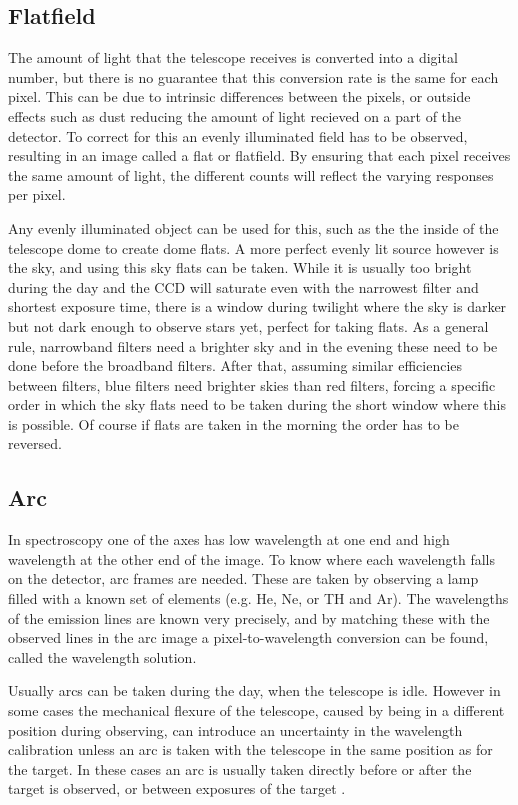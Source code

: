 \documentclass[a4paper,oneside,12pt, class=Latex/Classes/PhDthesisPSnPDF, crop=false]{standalone}
\begin{document}
\subsection{Flatfield}
The amount of light that the telescope receives is converted into a digital number, but there is no guarantee that this conversion rate is the same for each pixel. This can be due to intrinsic differences between the pixels, or outside effects such as dust reducing the amount of light recieved on a part of the detector. To correct for this an evenly illuminated field has to be observed, resulting in an image called a flat or flatfield. By ensuring that each pixel receives the same amount of light, the different counts will reflect the varying responses per pixel.

Any evenly illuminated object can be used for this, such as the the inside of the telescope dome to create dome flats. A more perfect evenly lit source however is the sky, and using this sky flats can be taken. While it is usually too bright during the day and the CCD will saturate even with the narrowest filter and shortest exposure time, there is a window during twilight where the sky is darker but not dark enough to observe stars yet, perfect for taking flats. As a general rule, narrowband filters need a brighter sky and in the evening these need to be done before the broadband filters. After that, assuming similar efficiencies between filters, blue filters need brighter skies than red filters, forcing a specific order in which the sky flats need to be taken during the short window where this is possible. Of course if flats are taken in the morning the order has to be reversed.


\subsection{Arc}
In spectroscopy one of the axes has low wavelength at one end and high wavelength at the other end of the image. To know where each wavelength falls on the detector, arc frames are needed. These are taken by observing a lamp filled with a known set of elements (e.g. He, Ne, or TH and Ar). The wavelengths of the emission lines are known very precisely, and by matching these with the observed lines in the arc image a pixel-to-wavelength conversion can be found, called the wavelength solution.

Usually arcs can be taken during the day, when the telescope is idle. However in some cases the mechanical flexure of the telescope, caused by being in a different position during observing, can introduce an uncertainty in the wavelength calibration unless an arc is taken with the telescope in the same position as for the target. In these cases an arc is usually taken directly before or after the target is observed, or between exposures of the target \citep{CCD_handbook}.
\end{document}

